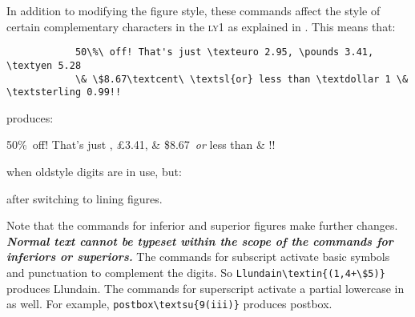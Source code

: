 \documentclass[11pt,british]{article}
\begin{document}
	In addition to modifying the figure style, these commands affect the style of certain complementary characters in the \textsc{ly1} as explained in . This means that:
		\begin{verbatim}
			50\%\ off! That's just \texteuro 2.95, \pounds 3.41, \textyen 5.28 
			\& \$8.67\textcent\ \textsl{or} less than \textdollar 1 \& \textsterling 0.99!!
		\end{verbatim}
	 produces:
		\begin{center}
			50\%\ off! That's just , \pounds 3.41, 
			\& \$8.67\textcent\ \textsl{or} less than  \& !!
		\end{center}
		when oldstyle digits are in use, but:
		\begin{center}
		\end{center}
		after switching to lining figures.
		
	Note that the commands for inferior and superior figures make further changes. \textbf{\emph{Normal text cannot be typeset within the scope of the commands for inferiors or superiors.}} The commands for subscript activate basic symbols and punctuation to complement the digits. So \verb|Llundain\textin{(1,4+\$5)}| produces Llundain. The commands for superscript activate a partial lowercase in as well. For example, \verb|postbox| produces postbox\textsu{9(iii)}.
		
\end{document}

